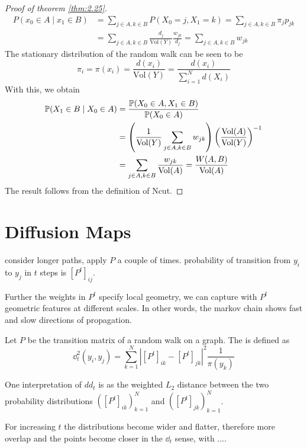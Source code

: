 \begin{proof}[Proof of theorem \ref{thm:2.25}]
    \begin{align*}
        P(x_0\in A\mid x_1\in B)&=\sum_{j\in A,k\in B} P(X_0=j,X_1=k)=\sum_{j\in A,k\in B}\pi_{j}p_{jk}\\
        &=\sum_{j\in A,k\in B} \frac{d_j}{\text{Vol}(Y)}\frac{w_{jk}}{d_j}=\sum_{j\in A, k\in B} w_{jk}
    \end{align*}
    The stationary distribution of the random walk can be seen to be 
    \[\pi_i=\pi(x_i)=\frac{d(x_i)}{\text{Vol}(Y)}=\frac{d(x_i)}{\sum_{i=1}^N d(X_i)}\]
    With this, we obtain 
    \begin{align*}
        \mathbb{P}(X_1\in B\mid X_0\in A)&=\frac{\mathbb{P}(X_0\in A,X_1\in B)}{\mathbb{P}(X_0\in A)}\\
        &=\left(\frac{1}{\text{Vol}(Y)}\sum_{j\in A,k\in B}w_{jk}\right)\left(\frac{\text{Vol}(A)}{\text{Vol}(Y)}\right)^{-1}\\
        &=\sum_{j\in A,k\in B}\frac{w_{jk}}{\text{Vol}(A)}=\frac{W(A,B)}{\text{Vol}(A)}
    \end{align*}
    The result follows from the definition of Ncut.
\end{proof}

\section{Diffusion Maps}

 consider longer paths, apply $P$ a couple of times. probability of transition from $y_i$ to $y_j$
in $t$ steps is $[P^t]_{ij}$.

Further the weights in $P^t$ specify local geometry, we can capture with $P^t$ geometric features
at different scales. In other words, the markov chain shows fast and slow directions of propagation.


\begin{definition}\label{def:2.26}
    Let $P$ be the transition matrix of a random walk on a graph. The  is defined as 
    \[\dd_t^2(y_i,y_j)=\sum_{k=1}^N \left\vert [P^t]_{ik}-[P^t]_{jk}\right\vert^2\frac{1}{\pi(y_k)}\]
\end{definition}

One interpretation of $dd_t$ is as the weighted $L_2$ distance between the two probability distributions $([P^t]_{ik})_{k=1}^N$ and $([P^t]_{jk})_{k=1}^N$.

For increasing $t$ the distributions become wider and flatter, therefore more overlap and the points become closer in the 
$\dd_t$ sense, with .... %


